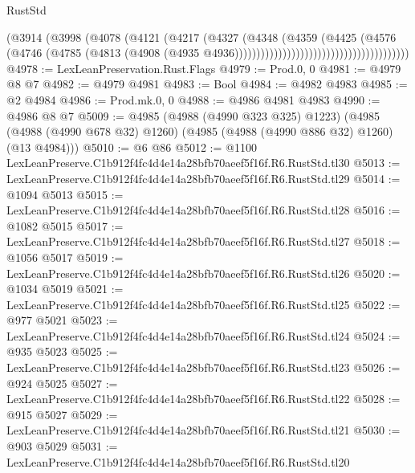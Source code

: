 \begin{lexlean}{RustStd}
\begin{coremodule}
                                                      (@3914
                                                        (@3998
                                                          (@4078
                                                            (@4121
                                                              (@4217
                                                                (@4327
                                                                  (@4348
                                                                    (@4359
                                                                      (@4425
                                                                        (@4576
                                                                          (@4746
                                                                            (@4785
                                                                              (@4813
                                                                                (@4908
                                                                                  (@4935
                                                                                    @4936))))))))))))))))))))))))))))))))))))))))
@4978 := LexLeanPreservation.Rust.Flags
@4979 := Prod.{0, 0}
@4981 := @4979 @8 @7
@4982 := @4979 @4981
@4983 := Bool
@4984 := @4982 @4983
@4985 := @2 @4984
@4986 := Prod.mk.{0, 0}
@4988 := @4986 @4981 @4983
@4990 := @4986 @8 @7
@5009 := @4985
    (@4988 (@4990 @323 @325) @1223)
    (@4985 (@4988 (@4990 @678 @32) @1260) (@4985 (@4988 (@4990 @886 @32) @1260) (@13 @4984)))
@5010 := @6 @86
@5012 := @1100 LexLeanPreserve.C1b912f4fc4d4e14a28bfb70aeef5f16f.R6.RustStd.tl30
@5013 := LexLeanPreserve.C1b912f4fc4d4e14a28bfb70aeef5f16f.R6.RustStd.tl29
@5014 := @1094 @5013
@5015 := LexLeanPreserve.C1b912f4fc4d4e14a28bfb70aeef5f16f.R6.RustStd.tl28
@5016 := @1082 @5015
@5017 := LexLeanPreserve.C1b912f4fc4d4e14a28bfb70aeef5f16f.R6.RustStd.tl27
@5018 := @1056 @5017
@5019 := LexLeanPreserve.C1b912f4fc4d4e14a28bfb70aeef5f16f.R6.RustStd.tl26
@5020 := @1034 @5019
@5021 := LexLeanPreserve.C1b912f4fc4d4e14a28bfb70aeef5f16f.R6.RustStd.tl25
@5022 := @977 @5021
@5023 := LexLeanPreserve.C1b912f4fc4d4e14a28bfb70aeef5f16f.R6.RustStd.tl24
@5024 := @935 @5023
@5025 := LexLeanPreserve.C1b912f4fc4d4e14a28bfb70aeef5f16f.R6.RustStd.tl23
@5026 := @924 @5025
@5027 := LexLeanPreserve.C1b912f4fc4d4e14a28bfb70aeef5f16f.R6.RustStd.tl22
@5028 := @915 @5027
@5029 := LexLeanPreserve.C1b912f4fc4d4e14a28bfb70aeef5f16f.R6.RustStd.tl21
@5030 := @903 @5029
@5031 := LexLeanPreserve.C1b912f4fc4d4e14a28bfb70aeef5f16f.R6.RustStd.tl20

\end{coremodule}
\end{lexlean}
